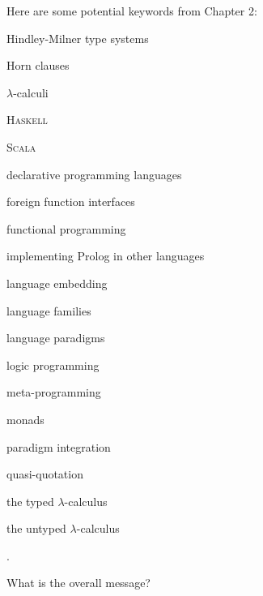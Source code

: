 \begin{scope}
Here are some potential keywords from Chapter 2:
\begin{inparaitem}
\item Hindley-Milner type systems
\item Horn clauses
\item \(\lambda\)-calculi
\item \textsc{Haskell}
\item \textsc{Scala}
\item declarative programming languages
\item foreign function interfaces
\item functional programming
\item implementing Prolog in other languages
\item language embedding
\item language families
\item language paradigms
\item logic programming
\item meta-programming
\item monads
\item paradigm integration
\item quasi-quotation
\item the typed \(\lambda\)-calculus
\item the untyped \(\lambda\)-calculus
\end{inparaitem}.

What is the overall message?


\end{scope}
